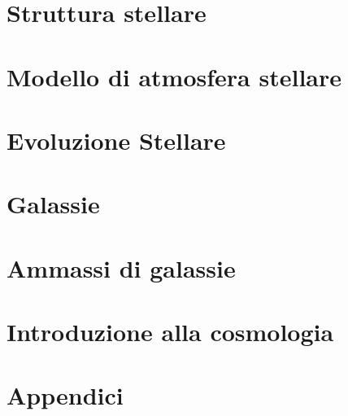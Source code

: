 \documentclass[11pt]{book} %
\begin{document}
\chapter{Struttura stellare}









\chapter{Modello di atmosfera stellare}



\chapter{Evoluzione Stellare}






\chapter{Galassie}









\chapter{Ammassi di galassie}

\chapter{Introduzione alla cosmologia}




%

\appendix
\chapter{Appendici}
%
%
%
\end{document}
